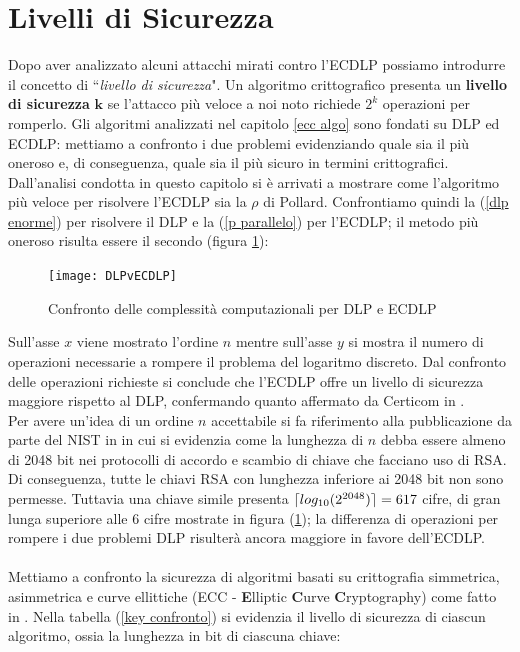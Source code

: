 \documentclass[a4paper,12pt]{tesiinfo}
\DeclarePairedDelimiter\ceil{\lceil}{\rceil}
\begin{document}
\section{Livelli di Sicurezza}
Dopo aver analizzato alcuni attacchi mirati contro l'ECDLP possiamo introdurre il concetto di ``\textit{livello di sicurezza}". Un algoritmo crittografico presenta un \textbf{livello di sicurezza }$\mathbold{k}$ se l'attacco pi\`u veloce a noi noto richiede $2^k$ operazioni per romperlo. Gli algoritmi analizzati nel capitolo \ref{ecc algo} sono fondati su DLP ed ECDLP: mettiamo a confronto i due problemi evidenziando quale sia il pi\`u oneroso e, di conseguenza, quale sia il pi\`u sicuro in termini crittografici.
\\
Dall'analisi condotta in questo capitolo si \`e arrivati a mostrare come l'algoritmo pi\`u veloce per risolvere l'ECDLP sia la $\rho$ di Pollard. Confrontiamo quindi la (\ref{dlp enorme}) per risolvere il DLP e la (\ref{p parallelo}) per l'ECDLP; il metodo pi\`u oneroso risulta essere il secondo (figura \ref{DLPvECDLP}):
\begin{figure}[H]
 \texttt{[image: DLPvECDLP]}
 \caption{Confronto delle complessit\`a computazionali per DLP e ECDLP}
 \label{DLPvECDLP}
\end{figure}
Sull'asse $x$ viene mostrato l'ordine $n$ mentre sull'asse $y$ si mostra il numero di operazioni necessarie a rompere il problema del logaritmo discreto. Dal confronto delle operazioni richieste si conclude che l'ECDLP offre un livello di sicurezza maggiore rispetto al DLP, confermando quanto affermato da Certicom in \cite{Certicom pollard p}. 
\\
Per avere un'idea di un ordine $n$ accettabile si fa riferimento alla pubblicazione da parte del NIST in \cite{NIST key lenght} in cui si evidenzia come la lunghezza di $n$ debba essere almeno di 2048 bit nei protocolli di accordo e scambio di chiave che facciano uso di RSA. Di conseguenza, tutte le chiavi RSA con lunghezza inferiore ai 2048 bit non sono permesse. Tuttavia una chiave simile presenta $\ceil{log_{10}(2^{2048})} = 617$ cifre, di gran lunga superiore alle 6 cifre mostrate in figura (\ref{DLPvECDLP}); la differenza di operazioni per rompere i due problemi DLP risulter\`a ancora maggiore in favore dell'ECDLP.
\\
\\
Mettiamo a confronto la sicurezza di algoritmi basati su crittografia simmetrica, asimmetrica e curve ellittiche (ECC - \textbf{E}lliptic \textbf{C}urve \textbf{C}ryptography) come fatto in \cite{nist key conf}. Nella tabella (\ref{key confronto}) si evidenzia il livello di sicurezza di ciascun algoritmo, ossia la lunghezza in bit di ciascuna chiave:
\end{document}
